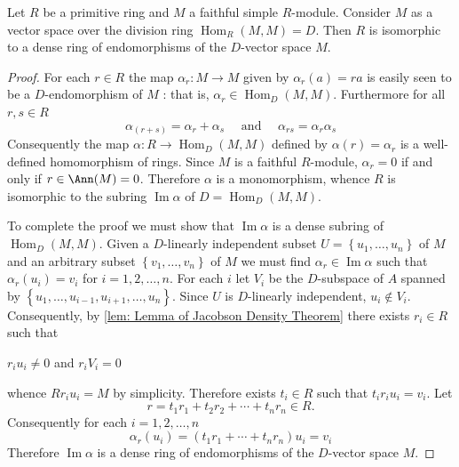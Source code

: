 \begin{theorem}
    \label{thm: Jacobson Density Theorem}
    Let $R$ be a primitive ring and $M$ a faithful simple $R$-module.
    Consider $M$ as a vector space over the division ring $\operatorname{Hom}_{R}(M, M)=D$.
    Then $R$ is isomorphic to a dense ring of endomorphisms of the $D$-vector space $M$.

    \begin{proof}
        For each $r \in R$ the map $\alpha_r: M \rightarrow M$ given by $\alpha_r(a)=r a$ is easily seen to be a $D$-endomorphism of $M$ : that is, $\alpha_r \in \operatorname{Hom}_D(M, M)$.
        Furthermore for all $r, s \in R$
        \begin{equation*}
            \alpha_{(r+s)}=\alpha_r+\alpha_s \quad \text { and } \quad \alpha_{r s}=\alpha_r \alpha_s
        \end{equation*}
        Consequently the map
        $\alpha: R \rightarrow \operatorname{Hom}_D(M, M)$ defined by $\alpha(r)=\alpha_r$
        is a well-defined homomorphism of rings. Since $M$ is a faithful $R$-module, $\alpha_r=0$ if and only if
        $r \in \Ann(M)=0$. Therefore $\alpha$ is a monomorphism, whence $R$ is isomorphic to the subring $\operatorname{Im} \alpha$ of $D=\operatorname{Hom}_D(M, M)$.

        To complete the proof we must show that $\operatorname{Im} \alpha$ is a dense subring of $\operatorname{Hom}_D(M, M)$. Given a $D$-linearly independent subset $U=\left\{u_1, \ldots, u_n\right\}$ of $M$ and an arbitrary subset $\left\{v_1, \ldots, v_n\right\}$ of $M$ we must find $\alpha_r \in \operatorname{Im} \alpha$ such that $\alpha_r\left(u_i\right)=v_i$ for $i=1,2, \ldots, n$.
        For each $i$ let $V_i$ be the $D$-subspace of $A$ spanned by $\left\{u_1, \ldots, u_{i-1}, u_{i+1}, \ldots, u_n\right\}$. Since $U$ is $D$-linearly independent, $u_i \notin V_i$. Consequently, by \ref{lem: Lemma of Jacobson Density Theorem} there exists $r_i \in R$ such that
        \begin{center}
            $r_i u_i \neq 0$ and $r_i V_i=0$
        \end{center}
        whence $R r_i u_i=M$ by simplicity. Therefore exists $t_i \in R$ such that $t_i r_i u_i=v_i$. Let
        \begin{equation*}
            r=t_1 r_1+t_2 r_2+\cdots+t_n r_n \in R .
        \end{equation*}
        Consequently for each $i=1,2, \ldots, n$
        \begin{equation*}
            \alpha_r\left(u_i\right)=\left(t_1 r_1+\cdots+t_n r_n\right) u_i
            =
            v_i
        \end{equation*}
        Therefore $\operatorname{Im} \alpha$ is a dense ring of endomorphisms of the $D$-vector space $M$.
    \end{proof}
\end{theorem}

